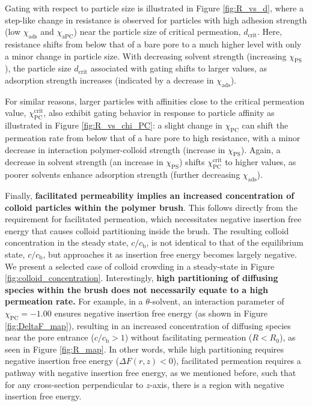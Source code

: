 \documentclass[12pt, a4paper]{article}
\begin{document}
Gating with respect to particle size is illustrated in Figure \ref{fig:R_vs_d}, where a step-like change in resistance is observed for particles with high adhesion strength (low $\chi_{\text{ads}}$ and $\chi_{\text{aPC}}$) near the particle size of critical permeation, $d_{\text{crit}}$.
Here, resistance shifts from below that of a bare pore to a much higher level with only a minor change in particle size.
With decreasing solvent strength (increasing $\chi_{\text{PS}}$), the particle size $d_{\text{crit}}$ associated with gating shifts to larger values, as adsorption strength increases (indicated by a decrease in $\chi_{\text{ads}}$).

For similar reasons, larger particles with affinities close to the critical permeation value, $\chi^{\text{crit}}_{\text{PC}}$, also exhibit gating behavior in response to particle affinity as illustrated in Figure \ref{fig:R_vs_chi_PC}: a slight change in $\chi_{\text{PC}}$ can shift the permeation rate from below that of a bare pore to high resistance, with a minor decrease in interaction polymer-colloid strength (increase in $\chi_{\text{PS}}$).
Again, a decrease in solvent strength (an increase in $\chi_{\text{PS}}$) shifts $\chi^{\text{crit}}_{\text{PC}}$ to higher values, as poorer solvents enhance adsorption strength (further decreasing $\chi_{\text{ads}}$).

Finally, \textbf{facilitated permeability implies an increased concentration of colloid particles within the polymer brush}.
This follows directly from the requirement for facilitated permeation, which necessitates negative insertion free energy that causes colloid partitioning inside the brush.
The resulting colloid concentration in the steady state, $c/c_{\text{b}}$, is not identical to that of the equilibrium state, $c/c_{\text{b}}$, but approaches it as insertion free energy becomes largely negative.
We present a selected case of colloid crowding in a steady-state in Figure \ref{fig:colloid_concentration}.
Interestingly, \textbf{high partitioning of diffusing species within the brush does not necessarily equate to a high permeation rate.}
For example, in a $\theta$-solvent, an interaction parameter of $\chi_{\text{PC}} = -1.00$ ensures negative insertion free energy (as shown in Figure \ref{fig:DeltaF_map}), resulting in an increased concentration of diffusing species near the pore entrance ($c/c_{\text{b}} > 1$) without facilitating permeation ($R < R_{0}$), as seen in Figure \ref{fig:R_map}.
In other words, while high partitioning requires negative insertion free energy ($\Delta F(r,z) < 0$), facilitated permeation requires a pathway with negative insertion free energy, as we mentioned before, such that for any cross-section perpendicular to $z$-axis, there is a region with negative insertion free energy.
\end{document}
